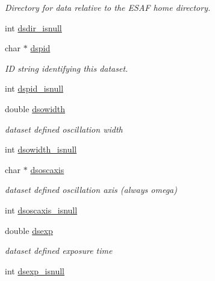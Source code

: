 \begin{DoxyCompactItemize}
\begin{DoxyCompactList}\small\item\em Directory for data relative to the ESAF home directory. \item\end{DoxyCompactList}\item 
int \hyperlink{structlspg__nextshot__struct_a8dea57b78b92d67d83ccbb6ed6da13ca}{dsdir\_\-isnull}
\item 
char $\ast$ \hyperlink{structlspg__nextshot__struct_a4487e718c2b55a8ab9ebb18329574ae1}{dspid}
\begin{DoxyCompactList}\small\item\em ID string identifying this dataset. \item\end{DoxyCompactList}\item 
int \hyperlink{structlspg__nextshot__struct_a7665485395487756ab448d0c81c84d10}{dspid\_\-isnull}
\item 
double \hyperlink{structlspg__nextshot__struct_ad5a8f568a04aa6a13767933062b28f19}{dsowidth}
\begin{DoxyCompactList}\small\item\em dataset defined oscillation width \item\end{DoxyCompactList}\item 
int \hyperlink{structlspg__nextshot__struct_a5dd3db64790e09bc03499e521bbaa126}{dsowidth\_\-isnull}
\item 
char $\ast$ \hyperlink{structlspg__nextshot__struct_a9a62c304e66013e8e5e5618a44f0b6d4}{dsoscaxis}
\begin{DoxyCompactList}\small\item\em dataset defined oscillation axis (always omega) \item\end{DoxyCompactList}\item 
int \hyperlink{structlspg__nextshot__struct_a51a26391afcacfb4c946fb9e8e9ab6b0}{dsoscaxis\_\-isnull}
\item 
double \hyperlink{structlspg__nextshot__struct_a063e4c99201a763c2eb048acfc855efa}{dsexp}
\begin{DoxyCompactList}\small\item\em dataset defined exposure time \item\end{DoxyCompactList}\item 
int \hyperlink{structlspg__nextshot__struct_ae07498f62ea9c0e2f702b78c87500794}{dsexp\_\-isnull}

\end{DoxyCompactItemize}
